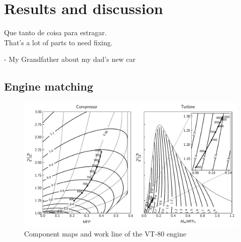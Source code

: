 \documentclass[tcc]{subfiles}
\begin{document}
\chapter{Results and discussion}
\label{sec:results}
\epigraph{Que tanto de coisa para estragar.\\{\footnotesize That's a lot of parts to need fixing.}}{- My Grandfather about my dad's new car}

\section{Engine matching}
\begin{figure}
    \AddThispageHook{\thispagestyle{empty}}
    \caption{Component maps and work line of the VT-80 engine}
\includegraphics{fig/wline.pdf}
\end{figure}
\end{document}
